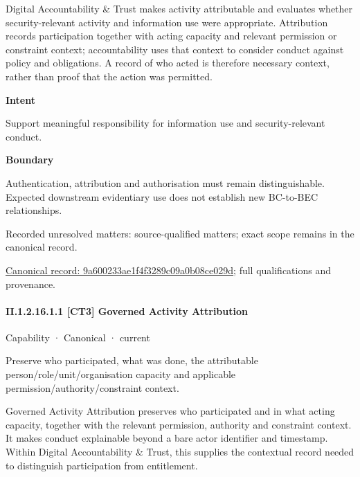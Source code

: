 Digital Accountability \& Trust makes activity attributable and evaluates whether security-relevant activity and information use were appropriate. Attribution records participation together with acting capacity and relevant permission or constraint context; accountability uses that context to consider conduct against policy and obligations. A record of who acted is therefore necessary context, rather than proof that the action was permitted.



\textbf{Intent}



Support meaningful responsibility for information use and security-relevant conduct.



\textbf{Boundary}



Authentication, attribution and authorisation must remain distinguishable. Expected downstream evidentiary use does not establish new BC-to-BEC relationships.


{\small Recorded unresolved matters: source-qualified matters; exact scope remains in the canonical record.}\par
{\footnotesize \href{../../../../../../../continuum/strategy/capability/9a600233ae1f4f3289c09a0b08ce029d.md}{Canonical record: 9a600233ae1f4f3289c09a0b08ce029d}; full qualifications and provenance.}\par
\paragraph*{II.1.2.16.1.1 [CT3] Governed Activity Attribution}
\label{navigation:II.1.2.16.1.1}

\label{element:646b3fd80a8b4f269691db7942e0f809}
{\small Capability · Canonical · current}\par

Preserve who participated, what was done, the attributable person/role/unit/organisation capacity and applicable permission/authority/constraint context.



Governed Activity Attribution preserves who participated and in what acting capacity, together with the relevant permission, authority and constraint context. It makes conduct explainable beyond a bare actor identifier and timestamp. Within Digital Accountability \& Trust, this supplies the contextual record needed to distinguish participation from entitlement.



